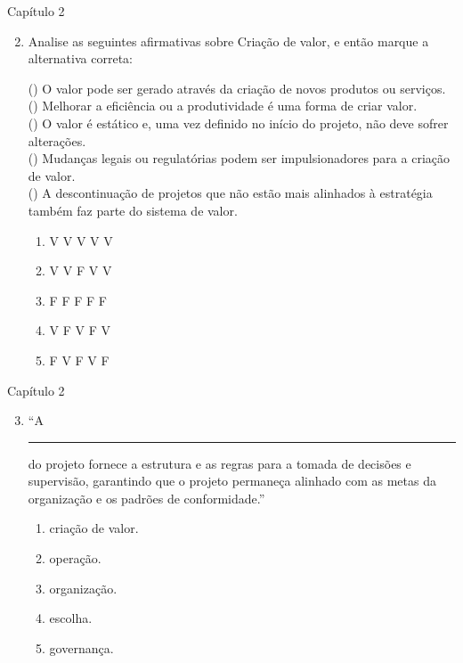 \documentclass{beamer}
\begin{document}
\begin{frame}{Capítulo 2}
	\begin{enumerate}
		\setcounter{enumi}{1}
		\justifying
		\item Analise as seguintes afirmativas sobre Criação de valor, e então marque a alternativa correta:
		
		\vspace{10pt} \footnotesize
		(\hspace{10pt}) O valor pode ser gerado através da criação de novos produtos ou serviços.\\
		(\hspace{10pt}) Melhorar a eficiência ou a produtividade é uma forma de criar valor.\\
		(\hspace{10pt}) O valor é estático e, uma vez definido no início do projeto, não deve sofrer alterações.\\
		(\hspace{10pt}) Mudanças legais ou regulatórias podem ser impulsionadores para a criação de valor.\\
		(\hspace{10pt}) A descontinuação de projetos que não estão mais alinhados à estratégia também faz parte do sistema de valor.
		
		\vspace{10pt} \normalsize
		\begin{enumerate}[a]
			\justifying
			\item V V V V V
			\item \alert<2>{V V F V V}
			\item F F F F F
			\item V F V F V
			\item F V F V F
		\end{enumerate}
	\end{enumerate}
\end{frame}

\begin{frame}{Capítulo 2}
	\begin{enumerate}
		\setcounter{enumi}{2}
		\justifying
		\item ``A \rule{50pt}{0.7pt} do projeto fornece a estrutura e as regras para a tomada de decisões e supervisão, garantindo que o projeto permaneça alinhado com as metas da organização e os padrões de conformidade.''
		\begin{enumerate}[a]
			\item criação de valor.
			\item operação.
			\item organização.
			\item escolha.
			\item \alert<2>{governança}.
		\end{enumerate}
	\end{enumerate}
\end{frame}
\end{document}
